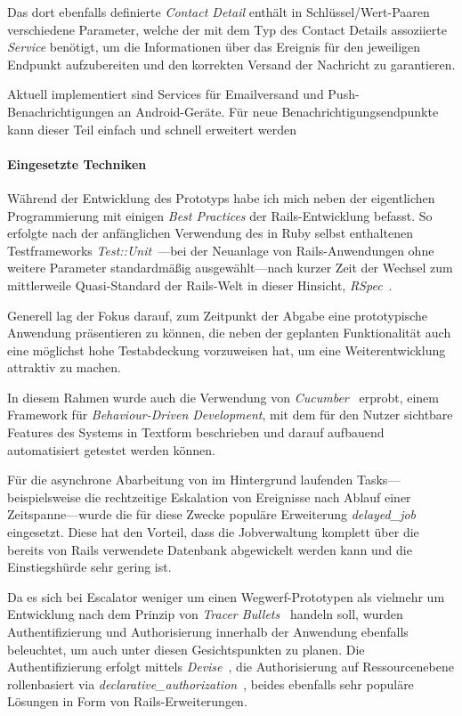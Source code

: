 \documentclass[11pt,utf8,notoc,bibnum,german,final]{zihpub}
\begin{document}
Das dort ebenfalls definierte \emph{Contact Detail} enthält in
Schlüssel/Wert-Paaren verschiedene Parameter, welche der mit dem Typ des
Contact Details assoziierte \emph{Service} benötigt, um die Informationen über
das Ereignis für den jeweiligen Endpunkt aufzubereiten und den korrekten
Versand der Nachricht zu garantieren.

Aktuell implementiert sind Services für Emailversand und
Push-Benachrichtigungen an Android-Geräte. Für neue Benachrichtigungsendpunkte
kann dieser Teil einfach und schnell erweitert werden


\paragraph{Eingesetzte Techniken}

Während der Entwicklung des Prototyps habe ich mich neben der eigentlichen
Programmierung mit einigen \emph{Best Practices} der Rails-Entwicklung befasst.
So erfolgte nach der anfänglichen Verwendung des in Ruby selbst enthaltenen
Testframeworks \emph{Test::Unit}~\cite{testunit}—bei der Neuanlage von
Rails-Anwendungen ohne weitere Parameter standardmäßig ausgewählt—nach kurzer
Zeit der Wechsel zum mittlerweile Quasi-Standard der Rails-Welt in dieser
Hinsicht, \emph{RSpec}~\cite{rspec}.

Generell lag der Fokus darauf, zum Zeitpunkt der Abgabe eine prototypische
Anwendung präsentieren zu können, die neben der geplanten Funktionalität auch
eine möglichst hohe Testabdeckung vorzuweisen hat, um eine Weiterentwicklung
attraktiv zu machen.

In diesem Rahmen wurde auch die Verwendung von \emph{Cucumber}~\cite{cucumber}
erprobt, einem Framework für \emph{Behaviour-Driven Development}, mit dem für
den Nutzer sichtbare Features des Systems in Textform beschrieben und darauf
aufbauend automatisiert getestet werden können.

Für die asynchrone Abarbeitung von im Hintergrund laufenden
Tasks—beispielsweise die rechtzeitige Eskalation von Ereignisse nach Ablauf
einer Zeitspanne—wurde die für diese Zwecke populäre Erweiterung
\emph{delayed\_job}~\cite{delayedjob} eingesetzt. Diese hat den Vorteil, dass
die Jobverwaltung komplett über die bereits von Rails verwendete Datenbank
abgewickelt werden kann und die Einstiegshürde sehr gering ist.

Da es sich bei Escalator weniger um einen Wegwerf-Prototypen als vielmehr um
Entwicklung nach dem Prinzip von \emph{Tracer
Bullets}~\cite[S. 47 ff.]{pragprog-tracerbullets} handeln soll, wurden Authentifizierung
und Authorisierung innerhalb der Anwendung ebenfalls beleuchtet, um auch unter
diesen Gesichtspunkten zu planen.  Die Authentifizierung erfolgt mittels
\emph{Devise}~\cite{devise}, die Authorisierung auf Ressourcenebene
rollenbasiert via
\emph{declarative\_authorization}~\cite{declarative-authorization}, beides
ebenfalls sehr populäre Lösungen in Form von Rails-Erweiterungen.
\end{document}
